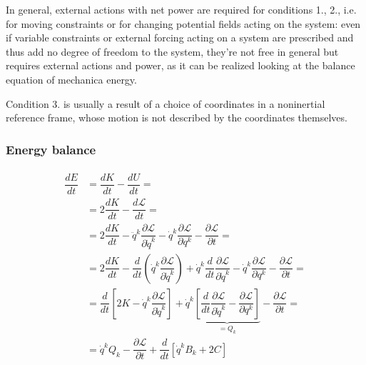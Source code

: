 \documentclass[letterpaper,10pt,english]{jupyterBook}
\begin{document}
\sphinxAtStartPar
In general, external actions with net power are required for conditions 1., 2., i.e. for moving constraints or for changing potential fields acting on the system: even if variable constraints or external forcing acting on a system are prescribed and thus add no degree of freedom to the system, they’re not free in general but requires external actions and power, as it can be realized looking at the balance equation of mechanica energy.

\sphinxAtStartPar
Condition 3. is usually a result of a choice of coordinates in a non\sphinxhyphen{}inertial reference frame, whose motion is not described by the coordinates themselves.


\subsubsection{Energy balance}
\label{\detokenize{ch/lagrange-t-explicit:energy-balance}}\begin{equation*}
\begin{split}\begin{aligned}
  \dfrac{d E}{d t}
  & = \dfrac{d K}{d t} - \dfrac{d U}{d t} = \\
  & = 2 \dfrac{d K}{d t} - \dfrac{d \mathscr{L}}{dt} = \\
  & = 2 \dfrac{d K}{d t} - \ddot{q}^k \dfrac{\partial \mathscr{L}}{\partial \dot{q}^k} - \dot{q}^k \dfrac{\partial \mathscr{L}}{\partial q^k} - \dfrac{\partial \mathscr{L}}{\partial t} = \\
  & = 2 \dfrac{d K}{d t} - \dfrac{d}{dt} \left( \dot{q}^k \dfrac{\partial \mathscr{L}}{\partial \dot{q}^k} \right) + \dot{q}^k \dfrac{d}{dt}\dfrac{\partial \mathscr{L}}{\partial \dot{q}^k} - \dot{q}^k \dfrac{\partial \mathscr{L}}{\partial q^k} - \dfrac{\partial \mathscr{L}}{\partial t} = \\
  & = \dfrac{d }{d t} \left[ 2 K - \dot{q}^k \dfrac{\partial \mathscr{L}}{\partial \dot{q}^k} \right] + \dot{q}^k \underbrace{ \left[ \dfrac{d}{dt}\dfrac{\partial \mathscr{L}}{\partial \dot{q}^k} - \dfrac{\partial \mathscr{L}}{\partial q^k} \right]}_{= Q_k} - \dfrac{\partial \mathscr{L}}{\partial t} = \\
  & = \dot{q}^k Q_k - \dfrac{\partial \mathscr{L}}{\partial t} + \dfrac{d}{dt} \left[ \dot{q}^k B_k + 2C \right]
\end{aligned}\end{split}
\end{equation*}
\end{document}
